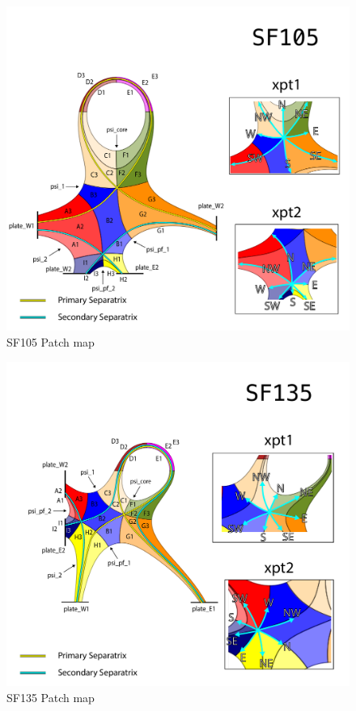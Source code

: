 \begin{figure}[H]
    \centering
        \includegraphics[width=\textwidth]{figures/configurations/SF105_collection.pdf}
        \caption{SF105 Patch map}
        \label{fig:sf105_patch_map}
\end{figure}
\begin{figure}[H]
    \centering
        \includegraphics[width=1.05\textwidth]{figures/configurations/SF135_collection.pdf}
        \caption{SF135 Patch map}
        \label{fig:sf135_patch_map}
\end{figure}
